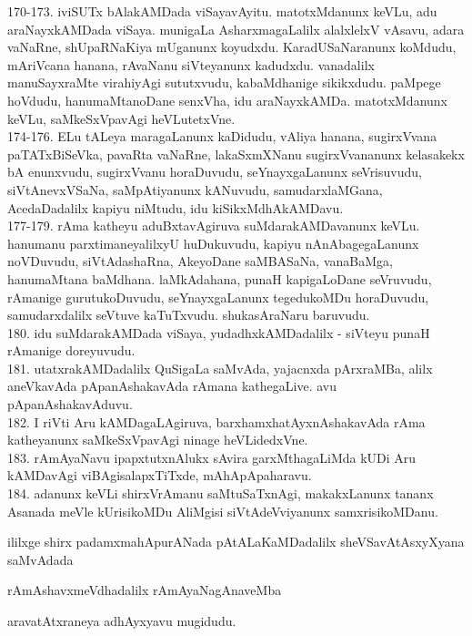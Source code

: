 \documentclass{article}
\begin{document}
170-173. iviSUTx bAlakAMDada viSayavAyitu. matotxMdanunx keVLu, adu araNayxkAMDada viSaya. munigaLa AsharxmagaLalilx alalxlelxV vAsavu, adara vaNaRne, shUpaRNaKiya mUganunx koyudxdu. KaradUSaNaranunx koMdudu, mAriVcana hanana, rAvaNanu siVteyanunx kadudxdu. vanadalilx manuSayxraMte virahiyAgi sututxvudu, kabaMdhanige sikikxdudu. paMpege hoVdudu, hanumaMtanoDane senxVha, idu araNayxkAMDa. matotxMdanunx keVLu, saMkeSxVpavAgi heVLutetxVne.\\
174-176. ELu tALeya maragaLanunx kaDidudu, vAliya hanana, sugirxVvana paTATxBiSeVka, pavaRta vaNaRne, lakaSxmXNanu sugirxVvananunx kelasakekx bA enunxvudu, sugirxVvanu horaDuvudu, seYnayxgaLanunx seVrisuvudu, siVtAnevxVSaNa, saMpAtiyanunx kANuvudu, samudarxlaMGana, AcedaDadalilx kapiyu niMtudu, idu kiSikxMdhAkAMDavu.\\
177-179. rAma katheyu aduBxtavAgiruva suMdarakAMDavanunx keVLu. hanumanu parxtimaneyalilxyU huDukuvudu, kapiyu nAnAbagegaLanunx noVDuvudu, siVtAdashaRna, AkeyoDane saMBASaNa, vanaBaMga, hanumaMtana baMdhana. laMkAdahana, punaH kapigaLoDane seVruvudu, rAmanige gurutukoDuvudu, seYnayxgaLanunx tegedukoMDu horaDuvudu, samudarxdalilx seVtuve kaTuTxvudu. shukasAraNaru baruvudu.\\
180. idu suMdarakAMDada viSaya, yudadhxkAMDadalilx - siVteyu punaH rAmanige doreyuvudu.\\
181. utatxrakAMDadalilx QuSigaLa saMvAda, yajacnxda pArxraMBa, alilx aneVkavAda pApanAshakavAda rAmana kathegaLive. avu pApanAshakavAduvu.\\
182. I riVti Aru kAMDagaLAgiruva, barxhamxhatAyxnAshakavAda rAma katheyanunx saMkeSxVpavAgi ninage heVLidedxVne.\\
183. rAmAyaNavu ipapxtutxnAlukx sAvira garxMthagaLiMda kUDi Aru kAMDavAgi viBAgisalapxTiTxde, mAhApApaharavu.\\
184. adanunx keVLi shirxVrAmanu saMtuSaTxnAgi, makakxLanunx tananx Asanada meVle kUrisikoMDu AliMgisi siVtAdeVviyanunx samxrisikoMDanu.\\

\begin{center}
ililxge shirx padamxmahApurANada pAtALaKaMDadalilx sheVSavAtAsxyXyana saMvAdada
\end{center}

\begin{center}
rAmAshavxmeVdhadalilx rAmAyaNagAnaveMba
\end{center}

\begin{center}
aravatAtxraneya adhAyxyavu mugidudu.
\end{center}
\end{document}
